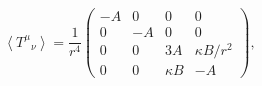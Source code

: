 \begin{equation}
\left< T^{\mu}{}_{\nu} \right> =\frac{1}{r^4}
\left(
     \begin{array}{cccc}
      -A &  0 & 0                    & 0 \\
       0 & -A & 0                    & 0 \\
       0 &  0 & 3A                   & \kappa B/r^2 \\
       0 &  0 & \kappa B             & -A
     \end{array}
\right)
\label{tmunumatrix},
\end{equation}

